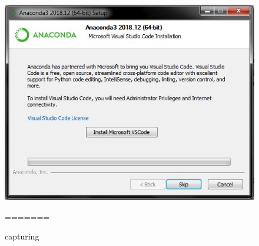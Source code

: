 \begin{enumerate}
\begin{itemize}
\begin{enumerate}
\begin{figure}[ht]
\centering
\includegraphics[scale=0.5]{figures/8.jpg}
\caption{capturing}
\label{proses instalasi}
=======

\end{figure}
\end{enumerate}
\end{itemize}
\end{enumerate}
